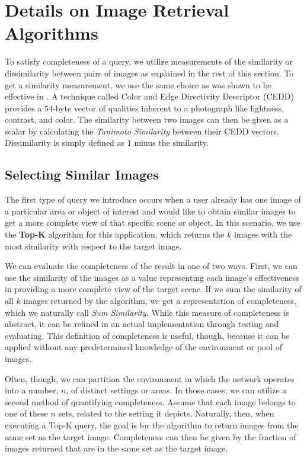 \appendices
{\color{blue}
\section{Details on Image Retrieval Algorithms}
\label{sec:image_retr_algs}

To satisfy completeness of a query, we utilize measurements of the similarity or dissimilarity between pairs of images as explained in the rest of this section.  To get a similarity measurement, we use the same choice as was shown to be effective in \cite{mediascope}.  A technique called Color and Edge Directivity Descriptor (CEDD) \cite{2008cedd} provides a $54$-byte vector of qualities inherent to a photograph like lightness, contrast, and color.  The similarity between two images can then be given as a scalar by calculating the \emph{Tanimoto Similarity} \cite{tanimoto} between their CEDD vectors.  Dissimilarity is simply defined as $1$ minus the similarity.

\subsection{Selecting Similar Images}
The first type of query we introduce occurs when a user already has one image of a particular area or object of interest and would like to obtain similar images to get a more complete view of that specific scene or object. In this scenario, we use the {\bf Top-K} algorithm for this application, which returns the $k$ images with the most similarity with respect to the target image. 

We can evaluate the completeness of the result in one of two ways.  First, we can use the similarity of the images as a value representing each image's effectiveness in providing a more complete view of the target scene.  If we sum the similarity of all $k$ images returned by the algorithm, we get a representation of completeness, which we naturally call \emph{Sum Similarity}.  While this measure of completeness is abstract, it can be refined in an actual implementation through testing and evaluating.  This definition of completeness is useful, though, because it can be applied without any predetermined knowledge of the environment or pool of images.  

Often, though, we can partition the environment in which the network operates into a number, $n$, of distinct settings or areas.  In those cases, we can utilize a second method of quantifying completeness.  Assume that each image belongs to one of these $n$ sets, %
related to the setting it depicts.  Naturally, then, when executing a Top-K query, the goal is for the algorithm to return images from the same set as the target image.  Completeness can then be given by the fraction of images returned that are in the same set as the target image.

}
